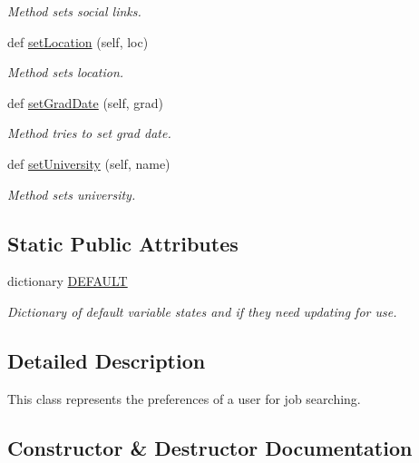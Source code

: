 \begin{DoxyCompactItemize}
\begin{DoxyCompactList}\small\item\em Method sets social links. \end{DoxyCompactList}\item 
def \hyperlink{classuserProfile_1_1userProfile_ad8b26311a1d9adf8b7b29c7d7ab73358}{set\+Location} (self, loc)
\begin{DoxyCompactList}\small\item\em Method sets location. \end{DoxyCompactList}\item 
def \hyperlink{classuserProfile_1_1userProfile_a49e06c1b0a539a79d66108e096fc46d6}{set\+Grad\+Date} (self, grad)
\begin{DoxyCompactList}\small\item\em Method tries to set grad date. \end{DoxyCompactList}\item 
def \hyperlink{classuserProfile_1_1userProfile_a33423b70af186c953dc94e302cc717d3}{set\+University} (self, name)
\begin{DoxyCompactList}\small\item\em Method sets university. \end{DoxyCompactList}\end{DoxyCompactItemize}
\subsection*{Static Public Attributes}
\begin{DoxyCompactItemize}
\item 
dictionary \hyperlink{classuserProfile_1_1userProfile_ac625f3eab69fbe3d90822c139bb87ced}{D\+E\+F\+A\+U\+LT}
\begin{DoxyCompactList}\small\item\em Dictionary of default variable states and if they need updating for use. \end{DoxyCompactList}\end{DoxyCompactItemize}


\subsection{Detailed Description}
This class represents the preferences of a user for job searching. 

\subsection{Constructor \& Destructor Documentation}
\mbox{\label{classuserProfile_1_1userProfile_acc3074e2b18f583f4c29112dc8c7ac10}} 
